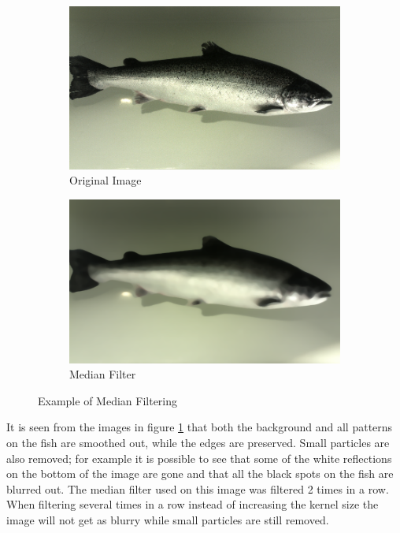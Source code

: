 \begin{figure}[ht]
    \centering
    \begin{subfigure}{0.5\textwidth}
        \centering
        \includegraphics[width=.99\linewidth]{images/literature/filtering/original_fish}
        \caption{Original Image}
    \end{subfigure}%
    \begin{subfigure}{.5\textwidth}
        \centering
        \includegraphics[width=.99\linewidth]{images/literature/filtering/median}
        \caption{Median Filter}
    \end{subfigure}
    \caption{Example of Median Filtering}
    \label{fig:median_filter}
\end{figure}

It is seen from the images in figure \ref{fig:median_filter} that both the background and all patterns on the fish are smoothed out, while the edges are preserved. Small particles are also removed; for example it is possible to see that some of the white reflections on the bottom of the image are gone and that all the black spots on the fish are blurred out. 
The median filter used on this image was filtered 2 times in a row. When filtering several times in a row instead of increasing the kernel size the image will not get as blurry while small particles are still removed.


